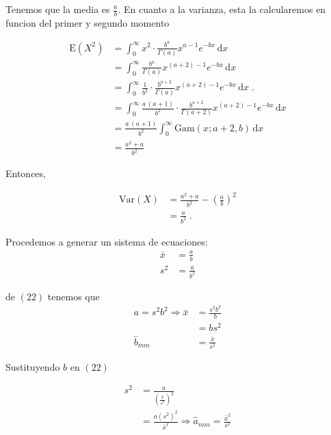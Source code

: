 \documentclass{article}
\begin{document}
    Tenemos que la media es $\frac{a}{b}$. En cuanto a la varianza, esta la calcularemos en funcion del primer y segundo momento

    \begin{align}
        \mathrm{E}(X^2) &= \int_{0}^{\infty} x^2 \cdot \frac{b^a}{\Gamma(a)} x^{a-1} e^{-bx} \, \mathrm{d}x \\
                        &= \int_{0}^{\infty} \frac{b^a}{\Gamma(a)} x^{(a+2)-1} e^{-bx} \, \mathrm{d}x \\
                        &= \int_{0}^{\infty} \frac{1}{b^2} \cdot \frac{b^{a+2}}{\Gamma(a)} x^{(a+2)-1} e^{-bx} \, \mathrm{d}x \; . \\
                        &= \int_{0}^{\infty} \frac{a \, (a+1)}{b^2} \cdot \frac{b^{a+2}}{\Gamma(a+2)} x^{(a+2)-1} e^{-bx} \, \mathrm{d}x \\
                        &= \frac{a \, (a+1)}{b^2} \int_{0}^{\infty} \mathrm{Gam}(x; a+2, b) \, \mathrm{d}x \\
                        &= \frac{a^2+a}{b^2}
    \end{align}

    Entonces, 

    \begin{align}
    \mathrm{Var}(X) &= \frac{a^2+a}{b^2} - \left( \frac{a}{b} \right)^2 \\
                    &= \frac{a}{b^2} \; .
    \end{align}

    Procedemos a generar un sistema de ecuaciones:
    \begin{align}
        \bar{x} &= \frac{a}{b} \\
        s^2 &= \frac{a}{b^2}
    \end{align}

    de $(22)$ tenemos que 
    \begin{align}
        a = s^2 b^2 \Rightarrow \bar{x} &= \frac{s^2 b^2}{b}\\
                                        &= b s^2 \\
        \hat{b}_{mm} &= \frac{\bar{x}}{s^2}
    \end{align}

    Sustituyendo $b$ en $(22)$

    \begin{align}
        s^2 &= \frac{a}{\left(\frac{\bar{x}}{s^2} \right)^2} \\
            &= \frac{a (s^2)^2}{\bar{x}^2} \Rightarrow \hat{a}_{mm} = \frac{\bar{x}^2}{s^2}
    \end{align}
\end{document}
